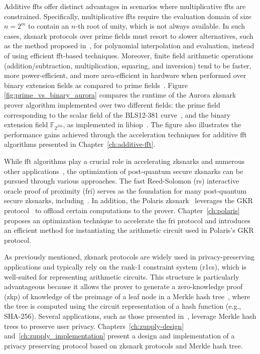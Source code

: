 Additive \glspl{fft} offer distinct advantages in scenarios where multiplicative \glspl{fft} are constrained. Specifically, multiplicative \glspl{fft} require the evaluation domain of size  $n=2^m$ to contain an $n$-th root of unity, which is not always available. In such cases, \gls{zksnark} protocols over prime fields must resort to slower alternatives, such as the method proposed in~\cite{BOSTAN2005Evaluation}, for polynomial interpolation and evaluation, instead of using efficient \gls{fft}-based techniques. Moreover, finite field arithmetic operations (addition/subtraction, multiplication, squaring, and inversion) tend to be faster, more power-efficient, and more area-efficient in hardware when performed over binary extension fields as compared to prime fields~\cite{Wenger2012PrimevsBinary, Diamond2023Towers}.
Figure \ref{fig:prime_vs_binary_aurora} compares the runtime of the Aurora \gls{zksnark}~\cite{Aurora2019} prover algorithm implemented over two different fields: the prime field corresponding to the scalar field of the BLS12-381 curve~\cite{BLS_curve2003}, and the binary extension field $\mathbb{F}_{2^{256}}$, as implemented in libiop~\cite{libiop}. The figure also illustrates the performance gains achieved through the acceleration techniques for additive \gls{fft} algorithms presented in Chapter~\ref{ch:additive-fft}.


While \gls{fft} algorithms play a crucial role in accelerating \glspl{zksnark} and numerous other applications~\cite{Bisheh2021NTT,LCH-Fast_Mult2018,LCH-Frobenius2018,BernsteinChouSchwabe2013,BernsteinChou2014}, the optimization of post-quantum secure \glspl{zksnark} can be pursued through various approaches. The fast Reed-Solomon (\gls{rs}) interactive oracle proof of proximity (\gls{fri}) serves as the foundation for many post-quantum secure \glspl{zksnark}, including~\cite{Ben-Sasson2018STARK,Aurora2019,Chiesa2020Fractal,Polaris}. In addition, the Polaris \gls{zksnark}~\cite{Polaris} leverages the GKR protocol~\cite{GKR2008} to offload certain computations to the prover. Chapter~\ref{ch:polaris} proposes an optimization technique to accelerate the \gls{fri} protocol and introduces an efficient method for instantiating the arithmetic circuit used in Polaris's GKR protocol.


As previously mentioned, \gls{zksnark} protocols are widely used in privacy-preserving applications and typically rely on the rank-1 constraint system (\gls{r1cs}), which is well-suited for representing arithmetic circuits. This structure is particularly advantageous because it allows the prover to generate a zero-knowledge proof (\gls{zkp}) of knowledge of the preimage of a leaf node in a Merkle hash tree~\cite{Merkle1980}, where the tree is computed using the circuit representation of a hash function (e.g., SHA-256). Several applications, such as those presented in~\cite{zcash-proc,Hawk,williamson2018aztec,ZEXE,Steffen2022Zapper}, leverage Merkle hash trees to preserve user privacy.
Chapters~\ref{ch:zupply-design} and~\ref{ch:zupply_implementation} present a design and implementation of a privacy preserving protocol based on \gls{zksnark} protocols and Merkle hash tree.

